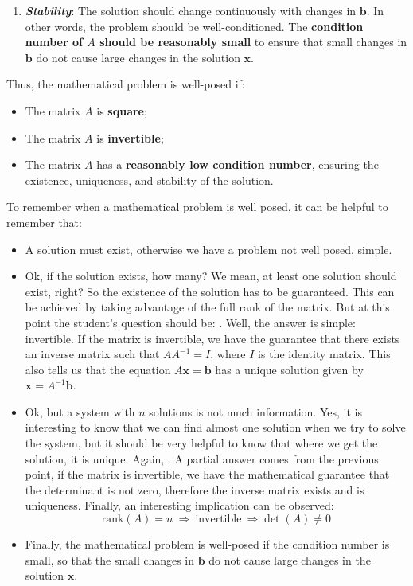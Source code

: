 \begin{enumerate}[label=\textcolor{Green3}{\textbf{\arabic*.}}]
\begin{enumerate}
        \item \emph{\textbf{Stability}}: The solution should change continuously with changes in $\mathbf{b}$. In other words, the problem should be well-conditioned. The \textbf{condition number of $A$ should be reasonably small} to ensure that small changes in $\mathbf{b}$ do not cause large changes in the solution $\mathbf{x}$.
    \end{enumerate}
    Thus, the mathematical problem is well-posed if:
    \begin{itemize}
        \item The matrix $A$ is \textbf{square};
        \item The matrix $A$ is \textbf{invertible};
        \item The matrix $A$ has a \textbf{reasonably low condition number}, ensuring the existence, uniqueness, and stability of the solution. 
    \end{itemize}
    \begin{tipbox}
        To remember when a mathematical problem is well posed, it can be helpful to remember that:
        \begin{itemize}
            \item A solution must exist, otherwise we have a problem not well posed, simple.
            \item Ok, if the solution exists, how many? We mean, at least one solution should exist, right? So the existence of the solution has to be guaranteed. This can be achieved by taking advantage of the full rank of the matrix. But at this point the student's question should be: . Well, the answer is simple: invertible. If the matrix is invertible, we have the guarantee that there exists an inverse matrix such that $A A^{-1} = I$, where $I$ is the identity matrix. This also tells us that the equation $A\mathbf{x} = \mathbf{b}$ has a unique solution given by $\mathbf{x} = A^{-1}\mathbf{b}$.
            \item Ok, but a system with $n$ solutions is not much information. Yes, it is interesting to know that we can find almost one solution when we try to solve the system, but it should be very helpful to know that where we get the solution, it is unique. Again, . A partial answer comes from the previous point, if the matrix is invertible, we have the mathematical guarantee that the determinant is not zero, therefore the inverse matrix exists and is uniqueness. Finally, an interesting implication can be observed:
            \begin{equation*}
                \mathrm{rank}\left(A\right) = n \: \Rightarrow \: \text{invertible} \: \Rightarrow \det\left(A\right) \ne 0
            \end{equation*}
            \item Finally, the mathematical problem is well-posed if the condition number is small, so that the small changes in $\mathbf{b}$ do not cause large changes in the solution $\mathbf{x}$.
        \end{itemize}
    \end{tipbox}



\end{enumerate}
